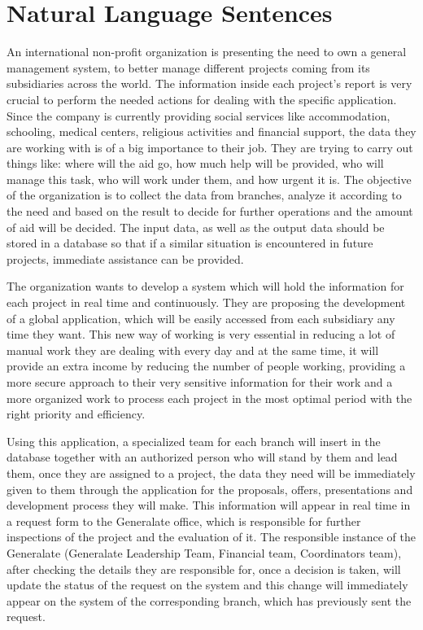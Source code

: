 
\color{red}
\section*{Natural Language Sentences}
\color{black}



An international non-profit organization is presenting the need to own a general management system, to better manage different projects coming from its subsidiaries across the world. The information inside each project’s report is very crucial to perform the needed actions for dealing with the specific application. Since the company is currently providing social services like accommodation, schooling, medical centers, religious activities and financial support, the data they are working with is of a big importance to their job. They are trying to carry out things like: where will the aid go, how much help will be provided, who will manage this task, who will work under them, and how urgent it is. The objective of the organization is to collect the data from branches, analyze it according to the need and based on the result to decide for further operations and the amount of aid will be decided. The input data, as well as the output data should be stored in a database so that if a similar situation is encountered in future projects, immediate assistance can be provided.

The organization wants to develop a system which will hold the information for each project in real time and continuously. They are proposing the development of a global application, which will be easily accessed from each subsidiary any time they want. This new way of working is very essential in reducing a lot of manual work they are dealing with every day and at the same time, it will provide an extra income by reducing the number of people working, providing a more secure approach to their very sensitive information for their work and a more organized work to process each project in the most optimal period with the right priority and efficiency.

Using this application, a specialized team for each branch will insert in the database together with an authorized person who will stand by them and lead them, once they are assigned to a project, the data they need will be immediately given to them through the application for the proposals, offers, presentations and development process they will make. This information will appear in real time in a request form to the Generalate office, which is responsible for further inspections of the project and the evaluation of it. The responsible instance of the Generalate (Generalate Leadership Team, Financial team, Coordinators team), after checking the details they are responsible for, once a decision is taken, will update the status of the request on the system and this change will immediately appear on the system of the corresponding branch, which has previously sent the request.

